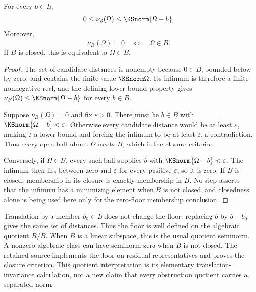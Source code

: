 \begin{KSproposition}\label{KS:KS76}
For every \(b\in B\),
\[
 0\le\nu_B(\Omega)\le\KSnorm{\Omega-b}.
\]
Moreover,
\[
 \nu_B(\Omega)=0\quad\Longleftrightarrow\quad\Omega\in\overline B.
\]
If \(B\) is closed, this is equivalent to \(\Omega\in B\).
\end{KSproposition}
\begin{proof}
The set of candidate distances is nonempty because \(0\in B\), bounded below by zero, and contains the finite value \(\KSnorm\Omega\). Its infimum is therefore a finite nonnegative real, and the defining lower-bound property gives \(\nu_B(\Omega)\le\KSnorm{\Omega-b}\) for every \(b\in B\).

Suppose \(\nu_B(\Omega)=0\) and fix \(\varepsilon>0\). There must be \(b\in B\) with \(\KSnorm{\Omega-b}<\varepsilon\). Otherwise every candidate distance would be at least \(\varepsilon\), making \(\varepsilon\) a lower bound and forcing the infimum to be at least \(\varepsilon\), a contradiction. Thus every open ball about \(\Omega\) meets \(B\), which is the closure criterion.

Conversely, if \(\Omega\in\overline B\), every such ball supplies \(b\) with \(\KSnorm{\Omega-b}<\varepsilon\). The infimum then lies between zero and \(\varepsilon\) for every positive \(\varepsilon\), so it is zero. If \(B\) is closed, membership in its closure is exactly membership in \(B\). No step asserts that the infimum has a minimizing element when \(B\) is not closed, and closedness alone is being used here only for the zero-floor membership conclusion.
\end{proof}
Translation by a member \(b_0\in B\) does not change the floor: replacing \(b\) by \(b-b_0\) gives the same set of distances. Thus the floor is well defined on the algebraic quotient \(R/B\). When \(B\) is a linear subspace, this is the usual quotient seminorm. A nonzero algebraic class can have seminorm zero when \(B\) is not closed. The retained source implements the floor on residual representatives and proves the closure criterion. This quotient interpretation is its elementary translation-invariance calculation, not a new claim that every obstruction quotient carries a separated norm.

